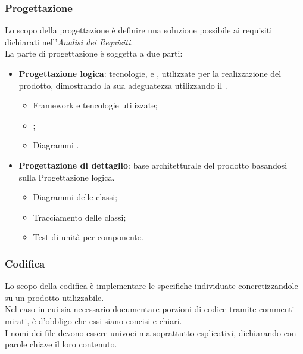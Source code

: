 \subsubsection{Progettazione} \label{sec:progettazione}
Lo scopo della progettazione è definire una soluzione possibile ai requisiti dichiarati nell'\textit{Analisi dei Requisiti}.
\\
La parte di progettazione è soggetta a due parti:
\begin{itemize}
    \item{\textbf{Progettazione logica}}: tecnologie,  e , utilizzate per la realizzazione del prodotto, dimostrando la sua adeguatezza utilizzando il .
    \begin{itemize}
        \item Framework e tencologie utilizzate;
        \item {};
        \item Diagrammi .
    \end{itemize}
    \item{\textbf{Progettazione di dettaglio}}: base architetturale del prodotto basandosi sulla Progettazione logica.
    \begin{itemize}
        \item Diagrammi delle classi;
        \item Tracciamento delle classi;
        \item Test di unità per componente.
    \end{itemize}
\end{itemize}
\subsubsection{Codifica} \label{sec:codifica}
Lo scopo della codifica è implementare le specifiche individuate concretizzandole su un prodotto utilizzabile.
\\
Nel caso in cui sia necessario documentare porzioni di codice tramite commenti mirati, è d'obbligo che essi siano concisi e chiari.
\\
I nomi dei file devono essere univoci ma soprattutto esplicativi, dichiarando con parole chiave il loro contenuto.
